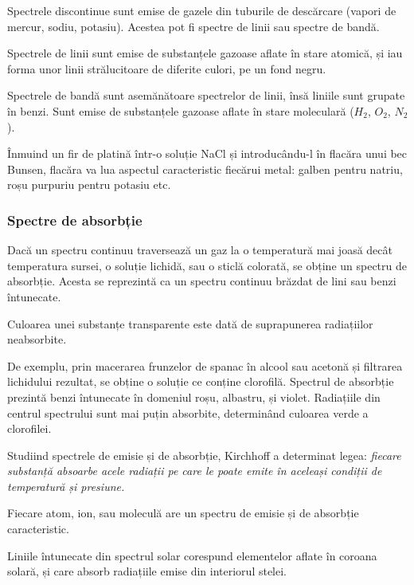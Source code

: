 Spectrele discontinue sunt emise de gazele din tuburile de descărcare (vapori
de mercur, sodiu, potasiu). Acestea pot fi spectre de linii sau spectre de
bandă.

Spectrele de linii sunt emise de substanțele gazoase aflate în stare atomică,
și iau forma unor linii strălucitoare de diferite culori, pe un fond negru.

Spectrele de bandă sunt asemănătoare spectrelor de linii, însă liniile sunt
grupate în benzi. Sunt emise de substanțele gazoase aflate în stare moleculară
($H_2$, $O_2$, $N_2$).

Înmuind un fir de platină într-o soluție NaCl și introducându-l în flacăra unui
bec Bunsen, flacăra va lua aspectul caracteristic fiecărui metal: galben pentru
natriu, roșu purpuriu pentru potasiu etc.

\subsubsection{Spectre de absorbție}

Dacă un spectru continuu traversează un gaz la o temperatură mai joasă decât
temperatura sursei, o soluție lichidă, sau o sticlă colorată, se obține un
spectru de absorbție. Acesta se reprezintă ca un spectru continuu brăzdat de
lini sau benzi întunecate.

Culoarea unei substanțe transparente este dată de suprapunerea radiațiilor
neabsorbite.

De exemplu, prin macerarea frunzelor de spanac în alcool sau acetonă și
filtrarea lichidului rezultat, se obține o soluție ce conține clorofilă.
Spectrul de absorbție prezintă benzi întunecate în domeniul roșu, albastru, și
violet. Radiațiile din centrul spectrului sunt mai puțin absorbite, determinând
culoarea verde a clorofilei.

Studiind spectrele de emisie și de absorbție, Kirchhoff a determinat legea:
\emph{fiecare substanță absoarbe acele radiații pe care le poate emite în
aceleași condiții de temperatură și presiune.}

Fiecare atom, ion, sau moleculă are un spectru de emisie și de absorbție
caracteristic.

Liniile întunecate din spectrul solar corespund elementelor aflate în coroana
solară, și care absorb radiațiile emise din interiorul stelei.

\clearpage

